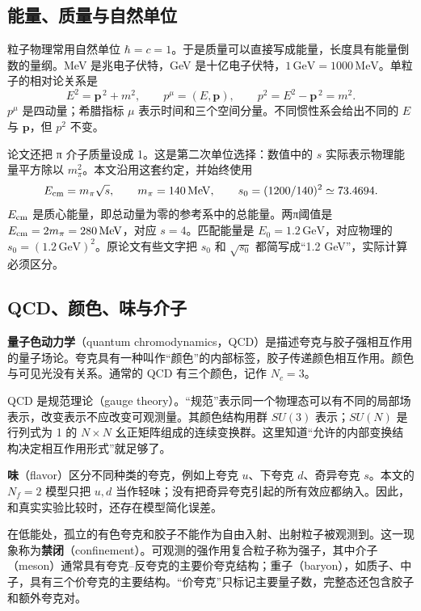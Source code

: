 \documentclass[UTF8,a4paper,11pt,fontset=fandol]{ctexart}
\numberwithin{equation}{section}
\newcommand{\GeV}{\,\mathrm{GeV}}
\newcommand{\MeV}{\,\mathrm{MeV}}
\begin{document}
\subsection{能量、质量与自然单位}
粒子物理常用自然单位 \(\hbar=c=1\)。于是质量可以直接写成能量，长度具有能量倒数的量纲。MeV 是兆电子伏特，GeV 是十亿电子伏特，\(1\GeV=1000\MeV\)。单粒子的相对论关系是
\begin{equation}
E^2=\boldsymbol p^{\,2}+m^2,\qquad p^\mu=(E,\boldsymbol p),\qquad p^2=E^2-\boldsymbol p^{\,2}=m^2.
\end{equation}
\(p^\mu\) 是四动量；希腊指标 \(\mu\) 表示时间和三个空间分量。不同惯性系会给出不同的 \(E\) 与 \(\boldsymbol p\)，但 \(p^2\) 不变。

论文还把 π 介子质量设成 1。这是第二次单位选择：数值中的 \(s\) 实际表示物理能量平方除以 \(m_\pi^2\)。本文沿用这套约定，并始终使用
\begin{equation}\label{eq:energyunits}
E_{\rm cm}=m_\pi\sqrt{s},\qquad m_\pi=140\MeV,
\qquad s_0=(1200/140)^2\simeq73.4694.
\end{equation}
\(E_{\rm cm}\) 是质心能量，即总动量为零的参考系中的总能量。两π阈值是 \(E_{\rm cm}=2m_\pi=280\MeV\)，对应 \(s=4\)。匹配能量是 \(E_0=1.2\GeV\)，对应物理的 \(s_0=(1.2\GeV)^2\)。原论文有些文字把 \(s_0\) 和 \(\sqrt{s_0}\) 都简写成“1.2 GeV”，实际计算必须区分。

\subsection{QCD、颜色、味与介子}
\textbf{量子色动力学}（quantum chromodynamics，QCD）是描述夸克与胶子强相互作用的量子场论。夸克具有一种叫作“颜色”的内部标签，胶子传递颜色相互作用。颜色与可见光没有关系。通常的 QCD 有三个颜色，记作 \(N_c=3\)。

QCD 是规范理论（gauge theory）。“规范”表示同一个物理态可以有不同的局部场表示，改变表示不应改变可观测量。其颜色结构用群 \(SU(3)\) 表示；\(SU(N)\) 是行列式为 1 的 \(N\times N\) 幺正矩阵组成的连续变换群。这里知道“允许的内部变换结构决定相互作用形式”就足够了。

\textbf{味}（flavor）区分不同种类的夸克，例如上夸克 \(u\)、下夸克 \(d\)、奇异夸克 \(s\)。本文的 \(N_f=2\) 模型只把 \(u,d\) 当作轻味；没有把奇异夸克引起的所有效应都纳入。因此，和真实实验比较时，还存在模型简化误差。

在低能处，孤立的有色夸克和胶子不能作为自由入射、出射粒子被观测到。这一现象称为\textbf{禁闭}（confinement）。可观测的强作用复合粒子称为强子，其中介子（meson）通常具有夸克--反夸克的主要价夸克结构；重子（baryon），如质子、中子，具有三个价夸克的主要结构。“价夸克”只标记主要量子数，完整态还包含胶子和额外夸克对。
\end{document}
